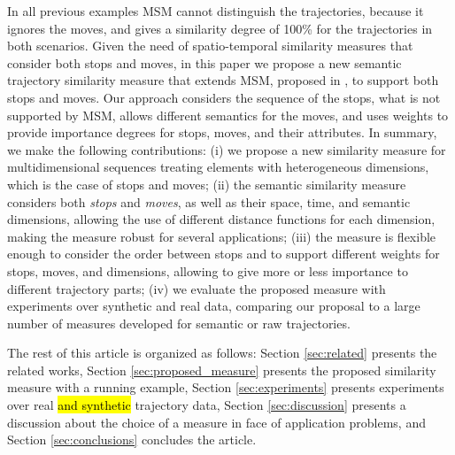 \documentclass[12pt]{article}
\begin{document}

In all previous examples MSM cannot distinguish the trajectories, because it ignores the moves, and gives a similarity degree of 100\% for the trajectories in both scenarios.
Given the need of spatio-temporal similarity measures that consider both stops and moves, in this paper we propose a new semantic trajectory similarity measure that extends MSM, proposed in \cite{Furtado:TGIS12156}, to support both stops and moves. Our approach considers the sequence of the stops, what is not supported by MSM, allows different semantics for the moves, and uses weights to provide importance degrees for stops, moves, and their attributes. 
In summary, we make the following contributions:
(i) we propose a new similarity measure for multidimensional sequences treating elements with heterogeneous dimensions, which is the case of stops and moves; (ii) the semantic similarity measure considers both \textit{stops} and \textit{moves}, as well as their space, time, and semantic dimensions, allowing the use of different distance functions for each dimension, making the measure robust for several applications; (iii) the measure is flexible enough to consider the order between stops and to support different weights for stops, moves, and dimensions, allowing to give more or less importance to different trajectory parts; (iv) we evaluate the proposed measure with experiments over synthetic and real data, comparing our proposal to a large number of measures developed for semantic or raw trajectories.

The rest of this article is organized as follows: Section \ref{sec:related} presents the related works, Section \ref{sec:proposed_measure} presents the proposed similarity measure with a running example, Section \ref{sec:experiments} presents experiments over real \hl{and synthetic} trajectory data, Section \ref{sec:discussion} presents a discussion about the choice of a measure in face of application problems, and Section \ref{sec:conclusions} concludes the article.
\end{document}
